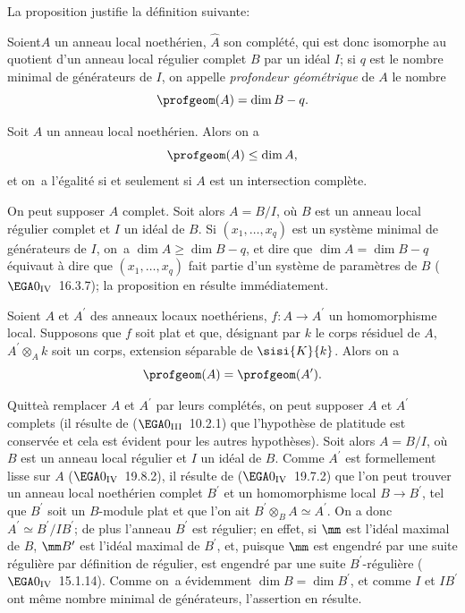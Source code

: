 La proposition  justifie la d\'efinition suivante:

\begin{definition} \label{XIV.5.3}
Soient\pageoriginale $A$ un anneau local noeth\'erien, $\widehat{A}$ son compl\'et\'e, qui est donc isomorphe au quotient d'un anneau local r\'egulier complet $B$ par un id\'eal $I$; si $q$ est le nombre minimal de g\'en\'erateurs de $I$, on appelle \emph{profondeur g\'eom\'etrique} de $A$ le nombre
$$
\profgeom(A)=\dim B-q.
$$
\end{definition}

\begin{proposition} \label{XIV.5.4} Soit $A$ un anneau local noeth\'erien. Alors on a
$$
\profgeom(A)\leq\dim A,
$$
et on~a l'\'egalit\'e si et seulement si $A$ est un intersection compl\`ete.
\end{proposition}

On peut supposer $A$ complet. Soit alors $A=B/I$, o\`u $B$ est un anneau local r\'egulier complet et $I$ un id\'eal de $B$. Si $(x_{1},\dots, x_{q})$ est un syst\`eme minimal de g\'en\'erateurs de $I$, on~a $\dim A\geq\dim B-q$, et dire que $\dim A=\dim B-q$ \'equivaut \`a dire que $(x_{1},\dots, x_{q})$ fait partie d'un syst\`eme de param\`etres de $B$ ($\EGA 0_{\textup{IV}}$~16.3.7); la proposition en r\'esulte imm\'ediatement.

\begin{proposition} \label{XIV.5.5} Soient $A$ et $A^{\prime}$ des anneaux locaux noeth\'eriens, $f\colon A\to A^{\prime}$ un homomorphisme local. Supposons que $f$ soit plat et que, d\'esignant par $k$ le corps r\'esiduel de $A$, $A^{\prime}\otimes_{A}k$ soit un corps, extension s\'eparable de $\sisi{K}{k}$. Alors on a
$$
\profgeom(A)=\profgeom(A^{\prime}).
$$
\end{proposition}

Quitte\pageoriginale \`a remplacer $A$ et $A^{\prime}$ par leurs compl\'et\'es, on peut supposer $A$ et $A^{\prime}$ complets (il r\'esulte de ($\EGA 0_{\textup{III}}$~10.2.1) que l'hypoth\`ese de platitude est conserv\'ee et cela est \'evident pour les autres hypoth\`eses). Soit alors $A=B/I$, o\`u $B$ est un anneau local r\'egulier et $I$ un id\'eal de $B$. Comme $A^{\prime}$ est formellement lisse sur $A$ ($\EGA 0_{\textup{IV}}$~19.8.2), il r\'esulte de ($\EGA 0_{\textup{IV}}$~19.7.2) que l'on peut trouver un anneau local noeth\'erien complet $B^{\prime}$ et un homomorphisme local $B\to B^{\prime}$, tel que $B^{\prime}$ soit un $B$-module plat et que l'on ait $B^{\prime}\otimes_{B}A\simeq A^{\prime}$. On a donc $A^{\prime}\simeq B^{\prime}/IB^{\prime}$; de plus l'anneau $B^{\prime}$ est r\'egulier; en effet, si $\mm$ est l'id\'eal maximal de $B$, $\mm B^{\prime}$ est l'id\'eal maximal de $B^{\prime}$, et, puisque $\mm$ est engendr\'e par une suite r\'eguli\`ere par d\'efinition de \og r\'egulier\fg,  est engendr\'e par une suite $B^{\prime}$-r\'eguli\`ere ($\EGA 0_{\textup{IV}}$~15.1.14). Comme on~a \'evidemment $\dim B=\dim B^{\prime}$, et comme $I$ et $IB^{\prime}$ ont m\^eme nombre minimal de g\'en\'erateurs, l'assertion en r\'esulte.

